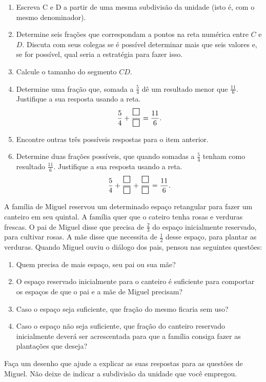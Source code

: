 \begin{atividade}{}
\begin{enumerate} [\quad a)] %
  \item     Escreva C e D a partir de uma mesma subdivisão da unidade (isto é, com o mesmo denominador).
  \item     Determine seis frações que correspondam a pontos na reta numérica entre $C$ e $D$. \newline
  Discuta com seus colegas se é possível determinar mais que seis valores e, se for possível, qual seria a estratégia para fazer isso.
  \item     Calcule o tamanho do segmento     $CD$.
  \item     Determine uma fração que, somada a     $\frac{5}{4}$     dê um resultado menor que     $\frac{11}{6}$. Justifique a sua resposta usando a reta.     $$ \dfrac{5}{4} +\dfrac{\text{\Large $\square$}}{\text{\Large $\square$}} = \dfrac{11}{6}.$$
  \item     Encontre outras três possíveis respostas para o item anterior.
  \item     Determine duas frações possíveis, que quando somadas a     $\frac{5}{4}$     tenham como resultado     $\frac{11}{6}$. Justifique a sua resposta usando a reta.     $$ \dfrac{5}{4} +\dfrac{\text{\Large $\square$}}{\text{\Large $\square$}} + \dfrac{\text{\Large $\square$}}{\text{\Large $\square$}} = \dfrac{11}{6}.$$
\end{enumerate} %
\end{atividade}

\begin{atividade}{}

A família de Miguel reservou um determinado espaço retangular para fazer um canteiro em seu quintal. A família quer que o cateiro tenha rosas e verduras frescas. O pai de Miguel disse que precisa de $\frac{2}{3}$ do espaço inicialmente reservado, para cultivar rosas. A mãe disse que necessita de $\frac{1}{2}$ desse espaço, para plantar as verduras. Quando Miguel ouviu o diálogo dos pais, pensou nas seguintes questões:
\begin{enumerate} [\quad a)] %
  \item     Quem precisa de mais espaço, seu pai ou sua mãe?
  \item     O espaço reservado inicialmente para o canteiro é suficiente para comportar os espaços de que o pai e a mãe de Miguel precisam?
  \item     Caso o espaço seja suficiente, que fração do mesmo ficaria sem uso?
  \item     Caso o espaço não seja suficiente, que fração do canteiro reservado inicialmente deverá ser acrescentada para que a família consiga fazer as plantações que deseja?
\end{enumerate} %


Faça um desenho que ajude a explicar as suas respostas para as questões de Miguel. Não deixe de indicar a subdivisão da unidade que você empregou.
\end{atividade}

